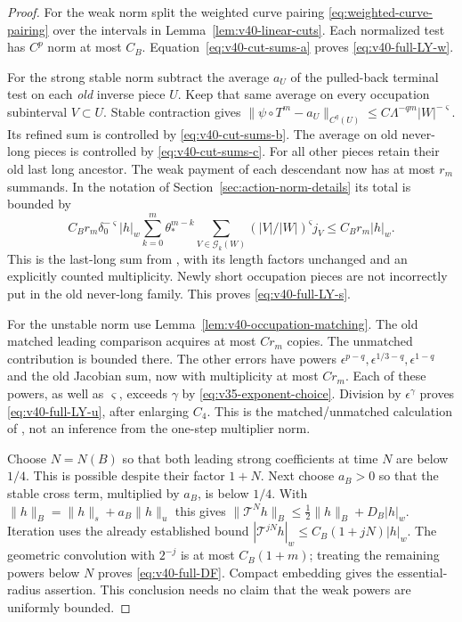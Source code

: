 \begin{proof}
For the weak norm split the weighted curve pairing
\eqref{eq:weighted-curve-pairing} over the intervals in
Lemma~\ref{lem:v40-linear-cuts}. Each normalized test has $C^p$ norm
at most $C_B$. Equation~\eqref{eq:v40-cut-sums-a} proves
\eqref{eq:v40-full-LY-w}.

For the strong stable norm subtract the average $a_U$ of the pulled-back
terminal test on each \emph{old} inverse piece $U$. Keep that same
average on every occupation subinterval $V\subset U$. Stable
contraction gives
$\|\psi\circ T^m-a_U\|_{C^q(U)}\le
 C\Lambda^{-qm}|W|^{-\varsigma}$.
Its refined sum is controlled by \eqref{eq:v40-cut-sums-b}.
The average on old never-long pieces is controlled by
\eqref{eq:v40-cut-sums-c}. For all other pieces retain their old last
long ancestor. The weak payment of each descendant now has at most
$r_m$ summands. In the notation of Section~\ref{sec:action-norm-details}
its total is bounded by
\[
 C_B r_m\delta_0^{-\varsigma}|h|_w
 \sum_{k=0}^m\theta_*^{m-k}
 \sum_{V\in\mathcal G_k(W)}(|V|/|W|)^\varsigma j_V
       \le C_B r_m|h|_w.
\]
This is the last-long sum from \cite[equations (4.7)--(4.11)]{DZ},
with its length factors unchanged and an explicitly counted
multiplicity. Newly short occupation pieces are not incorrectly put
in the old never-long family. This proves \eqref{eq:v40-full-LY-s}.

For the unstable norm use Lemma~\ref{lem:v40-occupation-matching}.
The old matched leading comparison acquires at most $Cr_m$ copies.
The unmatched contribution is bounded there. The other errors have
powers $\epsilon^{p-q},\epsilon^{1/3-q},\epsilon^{1-q}$ and the old
Jacobian sum, now with multiplicity at most $Cr_m$. Each of these
powers, as well as $\varsigma$, exceeds $\gamma$ by
\eqref{eq:v35-exponent-choice}. Division by $\epsilon^\gamma$
proves \eqref{eq:v40-full-LY-u}, after enlarging $C_4$. This is the
matched/unmatched calculation of \cite[Section 4.3]{DZ}, not an
inference from the one-step multiplier norm.

Choose $N=N(B)$ so that both leading strong coefficients at time $N$
are below $1/4$. This is possible despite their factor $1+N$. Next
choose $a_B>0$ so that the stable cross term, multiplied by $a_B$,
is below $1/4$. With $\|h\|_B=\|h\|_s+a_B\|h\|_u$ this gives
$\|\mathscr T^N h\|_B\le\frac12\|h\|_B+D_B|h|_w$.
Iteration uses the already established bound
$|\mathscr T^{jN}h|_w\le C_B(1+jN)|h|_w$.
The geometric convolution with $2^{-j}$ is at most $C_B(1+m)$;
treating the remaining powers below $N$ proves
\eqref{eq:v40-full-DF}. Compact embedding gives the essential-radius
assertion. This conclusion needs no claim that the weak powers are
uniformly bounded.


\end{proof}
